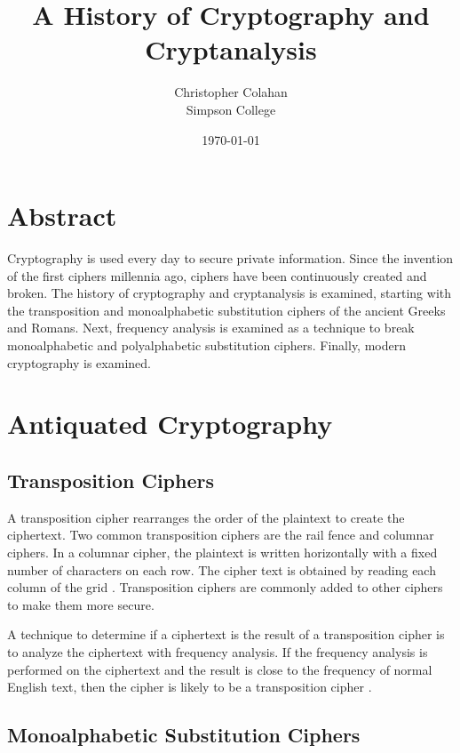 \documentclass[12pt]{article}
\title{A History of Cryptography and Cryptanalysis}
\date{\today}
\author{Christopher Colahan\\ Simpson College}
\begin{document}
\maketitle
\newpage

\tableofcontents
\listoffigures
\newpage



\section{Abstract}
Cryptography is used every day to secure private information. Since the invention of the first ciphers
millennia ago, ciphers have been continuously created and broken. The history of cryptography and
cryptanalysis is examined, starting with the transposition and monoalphabetic substitution ciphers of the
ancient Greeks and Romans. Next, frequency analysis is examined as a technique to break monoalphabetic
and polyalphabetic substitution ciphers. Finally, modern cryptography is examined.

\section{Antiquated Cryptography}
\subsection{Transposition Ciphers}
A transposition cipher rearranges the order of the plaintext to create the ciphertext. Two common transposition ciphers are the rail fence and columnar ciphers. In a columnar cipher, the plaintext is written horizontally with a fixed number of characters on each row. The cipher text is obtained by reading each column of the grid \cite{appcrypt}. Transposition ciphers are commonly added to other ciphers to make them more secure.

A technique to determine if a ciphertext is the result of a transposition cipher is to analyze the ciphertext with frequency analysis. If the frequency analysis is performed on the ciphertext and the result is close to the frequency of normal English text, then the cipher is likely to be a transposition cipher \cite{appcrypt}.

\subsection{Monoalphabetic Substitution Ciphers}
\end{document}
